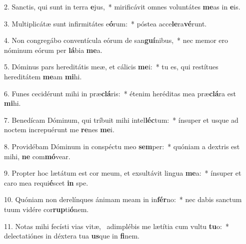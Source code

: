 2. Sanctis, qui sunt in terra \textbf{e}jus,~*  mirificávit omnes voluntátes \textbf{me}as in \textbf{e}is.\

3. Multiplicátæ sunt infirmitátes e\textbf{ó}rum:~*  póstea acce\textbf{le}ra\textbf{vé}runt.\

4. Non congregábo conventícula eórum de san\textbf{guí}nibus,~*  nec memor ero nóminum eórum per \textbf{lá}bia \textbf{me}a.\

5. Dóminus pars hereditátis meæ, et cálicis \textbf{me}i:~*  tu es, qui restítues hereditátem \textbf{me}am \textbf{mi}hi.\

6. Funes cecidérunt mihi in præ\textbf{clá}ris:~*  étenim heréditas mea præ\textbf{clá}ra est \textbf{mi}hi.\

7. Benedícam Dóminum, qui tríbuit mihi intel\textbf{léc}tum:~*  ínsuper et usque ad noctem increpuérunt me \textbf{re}nes \textbf{me}i.\

8. Providébam Dóminum in conspéctu meo \textbf{sem}per:~*  quóniam a dextris est mihi, \textbf{ne} com\textbf{mó}vear.\

9. Propter hoc lætátum est cor meum, et exsultávit lingua \textbf{me}a:~*  ínsuper et caro mea requi\textbf{é}scet \textbf{in} spe.\

10. Quóniam non derelínques ánimam meam in in\textbf{fér}no:~*  nec dabis sanctum tuum vidére cor\textbf{rup}ti\textbf{ó}nem.\

11. Notas mihi fecísti vias vitæ, \dag\  adimplébis me lætítia cum vultu \textbf{tu}o:~*  delectatiónes in déxtera tua \textbf{us}que in \textbf{fi}nem.\

